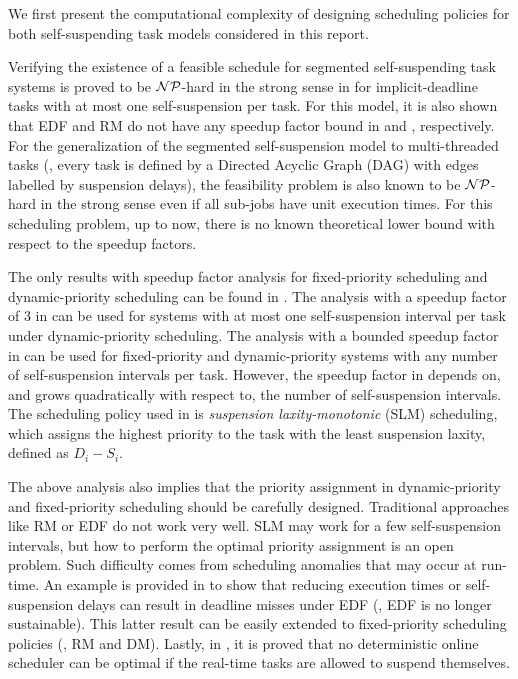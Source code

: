 
We first present the computational complexity of designing scheduling policies for both self-suspending task models considered in this report.

Verifying the existence of a feasible schedule for segmented self-suspending task systems is proved to be ${\cal NP}$-hard in the strong sense in \cite{Ridouard_2004} for implicit-deadline tasks with at most one self-suspension per task. For this model, it is also shown that EDF and RM do not have any speedup factor bound in \cite{Ridouard_2004} and \cite{RTSS-ChenL14}, respectively. For the generalization of the segmented self-suspension model to multi-threaded tasks (\ie, every task is defined by a Directed Acyclic Graph (DAG) with edges labelled by suspension delays), the feasibility problem is also known to be  ${\cal NP}$-hard in the strong sense  \cite{Ric03} even if all sub-jobs have unit execution times. For this scheduling problem, up to now, there is no known theoretical lower bound with respect to the speedup factors.

 The only results with speedup factor analysis for fixed-priority scheduling and dynamic-priority scheduling can be found in \cite{RTSS-ChenL14,WC16-suspend-DATE,Bruggen16RTNS}. The analysis with a speedup factor of $3$ in \cite{RTSS-ChenL14,Bruggen16RTNS} can be used for systems with at most one self-suspension interval per task under dynamic-priority scheduling. The analysis with a bounded speedup factor in \cite{WC16-suspend-DATE} can be used for fixed-priority and dynamic-priority systems with any number of self-suspension intervals per task. However, the speedup factor in \cite{WC16-suspend-DATE} depends on, and grows quadratically with respect to, the number of self-suspension intervals. 
 The scheduling policy used in \cite{WC16-suspend-DATE} is \emph{suspension laxity-monotonic} (SLM) scheduling, which assigns the highest priority to the task with the least suspension laxity, defined as $D_i-S_i$.


The above analysis also implies that the priority assignment in dynamic-priority and fixed-priority scheduling should be carefully designed. Traditional approaches like RM or EDF do not work very well. SLM may work for a few self-suspension intervals, but how to perform the optimal priority assignment is an open problem. Such difficulty comes from scheduling anomalies that may occur at run-time. An example is provided in \cite{Ridouard_2004}  to show that reducing execution times or self-suspension delays can result in deadline misses under EDF (\ie, EDF is no longer sustainable). This latter result can be easily extended to fixed-priority scheduling policies (\ie, RM and DM). Lastly, in \cite{RidouardR06}, it is proved that no deterministic online scheduler can be optimal if the real-time tasks are allowed to suspend themselves.



